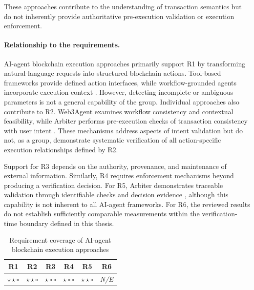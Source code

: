 These approaches contribute to the understanding of
transaction semantics but do not inherently provide
authoritative pre-execution validation or execution
enforcement.

\paragraph{Relationship to the requirements.}

AI-agent blockchain execution approaches primarily support
R1 by transforming natural-language requests into structured
blockchain actions. Tool-based frameworks provide defined
action interfaces, while workflow-grounded agents incorporate
execution context \cite{coinbaseAgentKit2026,TODO_Web3Agent}.
However, detecting incomplete or ambiguous parameters is
not a general capability of the group. Individual approaches also contribute to R2. Web3Agent
examines workflow consistency and contextual feasibility,
while Arbiter performs pre-execution checks of transaction
consistency with user intent
\cite{TODO_Web3Agent,TODO_Arbiter2026}.
These mechanisms address aspects of intent validation but
do not, as a group, demonstrate systematic verification of
all action-specific execution relationships defined by R2.

Support for R3 depends on the authority, provenance, and
maintenance of external information. Similarly, R4 requires
enforcement mechanisms beyond producing a verification
decision. For R5, Arbiter demonstrates traceable validation
through identifiable checks and decision evidence
\cite{TODO_Arbiter2026}, although this capability is not
inherent to all AI-agent frameworks. For R6, the reviewed
results do not establish sufficiently comparable measurements
within the verification-time boundary defined in this thesis.

\begin{table}[H]
\centering
\renewcommand{\arraystretch}{1.3}
\begin{tabular}{cccccc}
\hline
\textbf{R1} & \textbf{R2} & \textbf{R3} &
\textbf{R4} & \textbf{R5} & \textbf{R6} \\
\hline

$\star\star\circ$ &
$\star\star\circ$ &
$\star\circ\circ$ &
$\star\circ\circ$ &
$\star\star\circ$ &
\textit{N/E} \\

\hline
\end{tabular}
\caption{Requirement coverage of AI-agent blockchain
execution approaches}
\label{tab:req_ai_agent}
\end{table}

